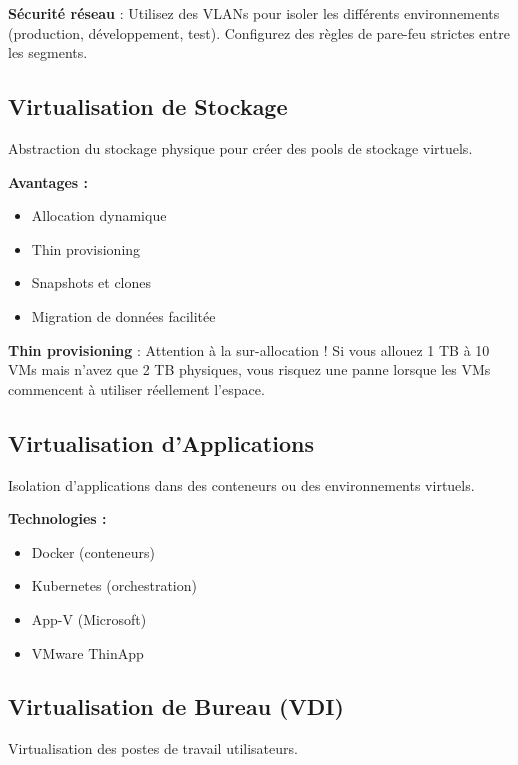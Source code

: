 \documentclass[11pt,a4paper]{article}
\begin{document}
\begin{tipbox}
\textbf{Sécurité réseau} : Utilisez des VLANs pour isoler les différents environnements (production, développement, test). Configurez des règles de pare-feu strictes entre les segments.
\end{tipbox}

\subsection{Virtualisation de Stockage}

Abstraction du stockage physique pour créer des pools de stockage virtuels.

\textbf{Avantages :}
\begin{itemize}
    \item Allocation dynamique
    \item Thin provisioning
    \item Snapshots et clones
    \item Migration de données facilitée
\end{itemize}

\begin{dangerbox}
\textbf{Thin provisioning} : Attention à la sur-allocation ! Si vous allouez 1 TB à 10 VMs mais n'avez que 2 TB physiques, vous risquez une panne lorsque les VMs commencent à utiliser réellement l'espace.
\end{dangerbox}

\subsection{Virtualisation d'Applications}

Isolation d'applications dans des conteneurs ou des environnements virtuels.

\textbf{Technologies :}
\begin{itemize}
    \item Docker (conteneurs)
    \item Kubernetes (orchestration)
    \item App-V (Microsoft)
    \item VMware ThinApp
\end{itemize}

\subsection{Virtualisation de Bureau (VDI)}

Virtualisation des postes de travail utilisateurs.
\end{document}
